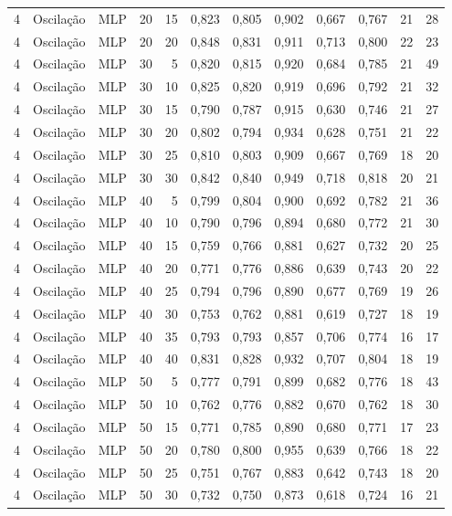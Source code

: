 \begin{longtable}{ccclrrrrrrrr}
4 & Oscilação & MLP & 20 & 15 & 0,823 & 0,805 & 0,902 & 0,667 & 0,767 & 21 & 28 \\
4 & Oscilação & MLP & 20 & 20 & 0,848 & 0,831 & 0,911 & 0,713 & 0,800 & 22 & 23 \\
4 & Oscilação & MLP & 30 & 5 & 0,820 & 0,815 & 0,920 & 0,684 & 0,785 & 21 & 49 \\
4 & Oscilação & MLP & 30 & 10 & 0,825 & 0,820 & 0,919 & 0,696 & 0,792 & 21 & 32 \\
4 & Oscilação & MLP & 30 & 15 & 0,790 & 0,787 & 0,915 & 0,630 & 0,746 & 21 & 27 \\
4 & Oscilação & MLP & 30 & 20 & 0,802 & 0,794 & 0,934 & 0,628 & 0,751 & 21 & 22 \\
4 & Oscilação & MLP & 30 & 25 & 0,810 & 0,803 & 0,909 & 0,667 & 0,769 & 18 & 20 \\
4 & Oscilação & MLP & 30 & 30 & 0,842 & 0,840 & 0,949 & 0,718 & 0,818 & 20 & 21 \\
4 & Oscilação & MLP & 40 & 5 & 0,799 & 0,804 & 0,900 & 0,692 & 0,782 & 21 & 36 \\
4 & Oscilação & MLP & 40 & 10 & 0,790 & 0,796 & 0,894 & 0,680 & 0,772 & 21 & 30 \\
4 & Oscilação & MLP & 40 & 15 & 0,759 & 0,766 & 0,881 & 0,627 & 0,732 & 20 & 25 \\
4 & Oscilação & MLP & 40 & 20 & 0,771 & 0,776 & 0,886 & 0,639 & 0,743 & 20 & 22 \\
4 & Oscilação & MLP & 40 & 25 & 0,794 & 0,796 & 0,890 & 0,677 & 0,769 & 19 & 26 \\
4 & Oscilação & MLP & 40 & 30 & 0,753 & 0,762 & 0,881 & 0,619 & 0,727 & 18 & 19 \\
4 & Oscilação & MLP & 40 & 35 & 0,793 & 0,793 & 0,857 & 0,706 & 0,774 & 16 & 17 \\
4 & Oscilação & MLP & 40 & 40 & 0,831 & 0,828 & 0,932 & 0,707 & 0,804 & 18 & 19 \\
4 & Oscilação & MLP & 50 & 5 & 0,777 & 0,791 & 0,899 & 0,682 & 0,776 & 18 & 43 \\
4 & Oscilação & MLP & 50 & 10 & 0,762 & 0,776 & 0,882 & 0,670 & 0,762 & 18 & 30 \\
4 & Oscilação & MLP & 50 & 15 & 0,771 & 0,785 & 0,890 & 0,680 & 0,771 & 17 & 23 \\
4 & Oscilação & MLP & 50 & 20 & 0,780 & 0,800 & 0,955 & 0,639 & 0,766 & 18 & 22 \\
4 & Oscilação & MLP & 50 & 25 & 0,751 & 0,767 & 0,883 & 0,642 & 0,743 & 18 & 20 \\
4 & Oscilação & MLP & 50 & 30 & 0,732 & 0,750 & 0,873 & 0,618 & 0,724 & 16 & 21 \\

\end{longtable}
